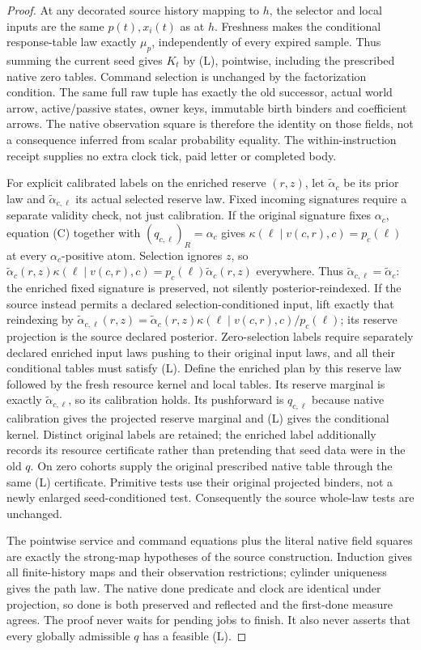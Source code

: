 \documentclass[11pt]{article}
\begin{document}
\begin{proof}
At any decorated source history mapping to $h$, the selector and local inputs are the same $p(t),x_i(t)$ as at $h$. Freshness makes the conditional response-table law exactly $\mu_p$, independently of every expired sample. Thus summing the current seed gives $K_t$ by (L), pointwise, including the prescribed native zero tables. Command selection is unchanged by the factorization condition. The same full raw tuple has exactly the old successor, actual world arrow, active/passive states, owner keys, immutable birth binders and coefficient arrows. The native observation square is therefore the identity on those fields, not a consequence inferred from scalar probability equality. The within-instruction receipt supplies no extra clock tick, paid letter or completed body.

For explicit calibrated labels on the enriched reserve $(r,z)$, let $\widetilde\alpha_c$ be its prior law and $\widetilde\alpha_{c,\ell}$ its actual selected reserve law. Fixed incoming signatures require a separate validity check, not just calibration. If the original signature fixes $\alpha_c$, equation (C) together with $(q_{c,\ell})_R=\alpha_c$ gives $\kappa(\ell\mid v(c,r),c)=p_c(\ell)$ at every $\alpha_c$-positive atom. Selection ignores $z$, so $\widetilde\alpha_c(r,z)\kappa(\ell\mid v(c,r),c)=p_c(\ell)\widetilde\alpha_c(r,z)$ everywhere. Thus $\widetilde\alpha_{c,\ell}=\widetilde\alpha_c$: the enriched fixed signature is preserved, not silently posterior-reindexed. If the source instead permits a declared selection-conditioned input, lift exactly that reindexing by $\widetilde\alpha_{c,\ell}(r,z)=\widetilde\alpha_c(r,z)\kappa(\ell\mid v(c,r),c)/p_c(\ell)$; its reserve projection is the source declared posterior. Zero-selection labels require separately declared enriched input laws pushing to their original input laws, and all their conditional tables must satisfy (L). Define the enriched plan by this reserve law followed by the fresh resource kernel and local tables. Its reserve marginal is exactly $\widetilde\alpha_{c,\ell}$, so its calibration holds. Its pushforward is $q_{c,\ell}$ because native calibration gives the projected reserve marginal and (L) gives the conditional kernel. Distinct original labels are retained; the enriched label additionally records its resource certificate rather than pretending that seed data were in the old $q$. On zero cohorts supply the original prescribed native table through the same (L) certificate. Primitive tests use their original projected binders, not a newly enlarged seed-conditioned test. Consequently the source whole-law tests are unchanged.

The pointwise service and command equations plus the literal native field squares are exactly the strong-map hypotheses of the source construction. Induction gives all finite-history maps and their observation restrictions; cylinder uniqueness gives the path law. The native done predicate and clock are identical under projection, so done is both preserved and reflected and the first-done measure agrees. The proof never waits for pending jobs to finish. It also never asserts that every globally admissible $q$ has a feasible (L).
\end{proof}
\end{document}
